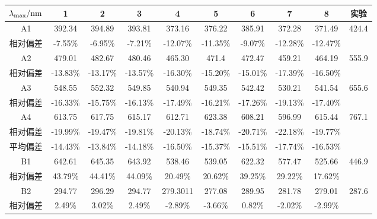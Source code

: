 \begin{table}[H]
    \centering
    \begin{adjustwidth}{-2cm}{-2cm}
    \begin{center}
    \begin{tabular}{cccccccccc}
    \toprule
    $\lambda_{\rm max}/\mathrm{nm}$ & 1 & 2 & 3 & 4 & 5 & 6 & 7 & 8 & 实验 \\
    \midrule
    A1 & 392.34 & 394.89 & 393.81 & 373.16 & 376.22 & 385.91 & 372.28 & 371.49 & 424.4 \\
    相对偏差 & -7.55\% & -6.95\% & -7.21\% & -12.07\% & -11.35\% & -9.07\% & -12.28\% & -12.47\% & \\
    \midrule
    A2 & 479.01 & 482.67 & 480.46 & 465.30 & 471.4 & 472.47 & 459.21 & 464.19 & 555.9 \\
    相对偏差 & -13.83\% & -13.17\% & -13.57\% & -16.30\% & -15.20\% & -15.01\% & -17.39\% & -16.50\% & \\
    \midrule
    A3 & 548.55 & 552.32 & 549.85 & 540.94 & 549.35 & 542.42 & 530.21 & 541.54 & 655.6 \\
    相对偏差 & -16.33\% & -15.75\% & -16.13\% & -17.49\% & -16.21\% & -17.26\% & -19.13\% & -17.40\% & \\
    \midrule
    A4 & 613.75 & 617.75 & 615.17 & 612.71 & 623.38 & 608.21 & 596.99 & 615.44 & 767.1 \\
    相对偏差 & -19.99\% & -19.47\% & -19.81\% & -20.13\% & -18.74\% & -20.71\% & -22.18\% & -19.77\% & \\
    \midrule
    平均偏差 & -14.43\% & -13.84\% & -14.18\% & -16.50\% & -15.37\% & -15.51\% & -17.74\% & -16.53\% & \\ 
    \toprule
    B1 & 642.61 & 645.35 & 643.92 & 538.46 & 539.05 & 622.32 & 577.47 & 525.66 & 446.9 \\
    相对偏差 & 43.79\% & 44.41\% & 44.09\% & 20.49\% & 20.62\% & 39.25\% & 29.22\% & 17.62\% & \\
    \midrule
    B2 & 294.77 & 296.29 & 294.77 & 279.3011 & 277.08 & 289.95 & 281.78 & 279.01 & 287.6 \\
    相对偏差 & 2.49\% & 3.02\% & 2.49\% & -2.89\% & -3.66\% & 0.82\% & -2.02\% & -2.99\% & \\
    \bottomrule
    \end{tabular}
    \end{center}
    \end{adjustwidth}
    \label{tab:7}
\end{table}

